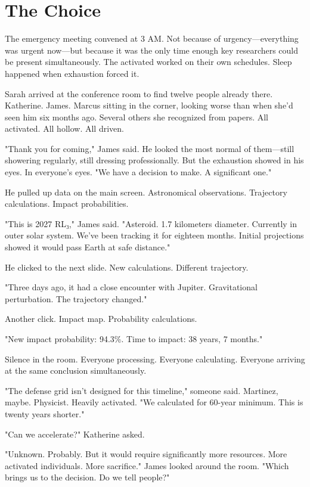 \chapter{The Choice}
\label{ch:24}


The emergency meeting convened at 3 AM. Not because of urgency—everything was urgent now—but because it was the only time enough key researchers could be present simultaneously. The activated worked on their own schedules. Sleep happened when exhaustion forced it.

Sarah arrived at the conference room to find twelve people already there. Katherine. James. Marcus sitting in the corner, looking worse than when she'd seen him six months ago. Several others she recognized from papers. All activated. All hollow. All driven.

"Thank you for coming," James said. He looked the most normal of them—still showering regularly, still dressing professionally. But the exhaustion showed in his eyes. In everyone's eyes. "We have a decision to make. A significant one."

He pulled up data on the main screen. Astronomical observations. Trajectory calculations. Impact probabilities.

"This is 2027 RL₃," James said. "Asteroid. 1.7 kilometers diameter. Currently in outer solar system. We've been tracking it for eighteen months. Initial projections showed it would pass Earth at safe distance."

He clicked to the next slide. New calculations. Different trajectory.

"Three days ago, it had a close encounter with Jupiter. Gravitational perturbation. The trajectory changed."

Another click. Impact map. Probability calculations.

"New impact probability: 94.3\%. Time to impact: 38 years, 7 months."

Silence in the room. Everyone processing. Everyone calculating. Everyone arriving at the same conclusion simultaneously.

"The defense grid isn't designed for this timeline," someone said. Martinez, maybe. Physicist. Heavily activated. "We calculated for 60-year minimum. This is twenty years shorter."

"Can we accelerate?" Katherine asked.

"Unknown. Probably. But it would require significantly more resources. More activated individuals. More sacrifice." James looked around the room. "Which brings us to the decision. Do we tell people?"

